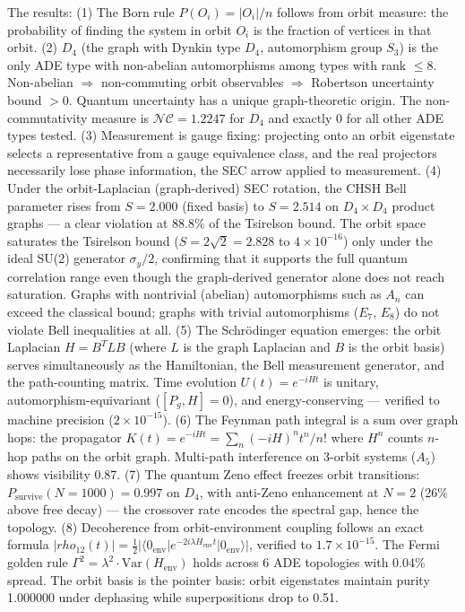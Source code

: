 \documentclass[11pt,a4paper]{article}
\begin{document}
The results: (1) The Born rule $P(O_i) = |O_i|/n$ follows from orbit measure: the probability of finding the system in orbit $O_i$ is the fraction of vertices in that orbit. (2) $D_4$ (the graph with Dynkin type $D_4$, automorphism group $S_3$) is the only ADE type with non-abelian automorphisms among types with rank $\leq 8$. Non-abelian $\Rightarrow$ non-commuting orbit observables $\Rightarrow$ Robertson uncertainty bound $> 0$. Quantum uncertainty has a unique graph-theoretic origin. The non-commutativity measure is $\mathcal{NC} = 1.2247$ for $D_4$ and exactly 0 for all other ADE types tested. (3) Measurement is gauge fixing: projecting onto an orbit eigenstate selects a representative from a gauge equivalence class, and the real projectors necessarily lose phase information, the SEC arrow applied to measurement. (4) Under the orbit-Laplacian (graph-derived) SEC rotation, the CHSH Bell parameter rises from $S = 2.000$ (fixed basis) to $S = 2.514$ on $D_4 \times D_4$ product graphs — a clear violation at 88.8\% of the Tsirelson bound. The orbit space saturates the Tsirelson bound ($S = 2\sqrt{2} = 2.828$ to $4 \times 10^{-16}$) only under the ideal SU(2) generator $\sigma_y/2$, confirming that it supports the full quantum correlation range even though the graph-derived generator alone does not reach saturation. Graphs with nontrivial (abelian) automorphisms such as $A_n$ can exceed the classical bound; graphs with trivial automorphisms ($E_7$, $E_8$) do not violate Bell inequalities at all. (5) The Schrödinger equation emerges: the orbit Laplacian $H = B^T L B$ (where $L$ is the graph Laplacian and $B$ is the orbit basis) serves simultaneously as the Hamiltonian, the Bell measurement generator, and the path-counting matrix. Time evolution $U(t) = e^{-iHt}$ is unitary, automorphism-equivariant ($[P_g, H] = 0$), and energy-conserving — verified to machine precision ($2 \times 10^{-15}$). (6) The Feynman path integral is a sum over graph hops: the propagator $K(t) = e^{-iHt} = \sum_n (-iH)^n t^n / n!$ where $H^n$ counts $n$-hop paths on the orbit graph. Multi-path interference on 3-orbit systems ($A_5$) shows visibility 0.87. (7) The quantum Zeno effect freezes orbit transitions: $P_{\text{survive}}(N=1000) = 0.997$ on $D_4$, with anti-Zeno enhancement at $N = 2$ (26\% above free decay) — the crossover rate encodes the spectral gap, hence the topology. (8) Decoherence from orbit-environment coupling follows an exact formula $|rho_{12}(t)| = \frac{1}{2}|\langle 0_{\text{env}}| e^{-2i\lambda H_{\text{env}} t} |0_{\text{env}}\rangle|$, verified to $1.7 \times 10^{-15}$. The Fermi golden rule $\Gamma^2 = \lambda^2 \cdot \text{Var}(H_{\text{env}})$ holds across 6 ADE topologies with 0.04\% spread. The orbit basis is the pointer basis: orbit eigenstates maintain purity 1.000000 under dephasing while superpositions drop to 0.51.
\end{document}
